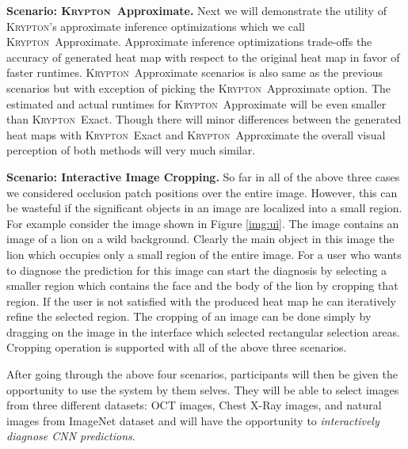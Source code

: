 \documentclass{vldb}
\newcommand{\system}{\textsc{Krypton}}
\begin{document}
\vspace{2mm}
\noindent \textbf{Scenario: \system~Approximate.} Next we will demonstrate the utility of \system's approximate inference optimizations which we call \system~Approximate.
Approximate inference optimizations trade-offs the accuracy of generated heat map with respect to the original heat map in favor of faster runtimes.
\system~Approximate scenarios is also same as the previous scenarios but with exception of picking the \system~Approximate option.
The estimated and actual runtimes for \system~Approximate will be even smaller than \system~Exact.
Though there will minor differences between the generated heat maps with \system~Exact and \system~Approximate the overall visual perception of both methods will very much similar.

\vspace{2mm}
\noindent \textbf{Scenario: Interactive Image Cropping.} So far in all of the above three cases we considered occlusion patch positions over the entire image.
However, this can be wasteful if the significant objects in an image are localized into a small region.
For example consider the image shown in Figure \ref{img:ui}.
The image contains an image of a lion on a wild background.
Clearly the main object in this image the lion which occupies only a small region of the entire image.
For a user who wants to diagnose the prediction for this image can start the diagnosis by selecting a smaller region which contains the face and the body of the lion by cropping that region.
If the user is not satisfied with the produced heat map he can iteratively refine the selected region.
The cropping of an image can be done simply by dragging on the image in the interface which selected rectangular selection areas.
Cropping operation is supported with all of the above three scenarios.

After going through the above four scenarios, participants will then be given the opportunity to use the system by them selves.
They will be able to select images from three different datasets: OCT images, Chest X-Ray images, and natural images from ImageNet dataset and will have the opportunity to \textit{interactively diagnose CNN predictions}.

\balance



\end{document}
